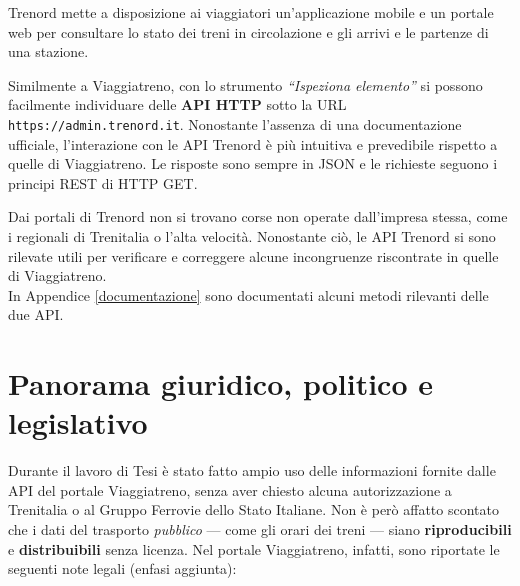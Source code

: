 \documentclass[12pt,italian]{report}
\begin{document}
Trenord mette a disposizione ai viaggiatori un'applicazione mobile e
un portale web per consultare lo stato dei treni in circolazione e gli
arrivi e le partenze di una stazione.

Similmente a Viaggiatreno, con lo strumento \textit{``Ispeziona
    elemento''} si possono facilmente individuare delle \textbf{API
    HTTP} sotto la URL \texttt{https://admin.trenord.it}.  Nonostante
l'assenza di una documentazione ufficiale, l'interazione con le API
Trenord è più intuitiva e prevedibile rispetto a quelle di
Viaggiatreno.  Le risposte sono sempre in JSON e le richieste seguono
i principi REST di HTTP GET.

Dai portali di Trenord non si trovano corse non operate dall'impresa
stessa, come i regionali di Trenitalia o l'alta velocità.  Nonostante
ciò, le API Trenord si sono rilevate utili per verificare e correggere
alcune incongruenze riscontrate in quelle di Viaggiatreno. \\

In Appendice \ref{documentazione} sono documentati alcuni metodi
rilevanti delle due API.

\section{Panorama giuridico, politico e legislativo}

Durante il lavoro di Tesi è stato fatto ampio uso delle informazioni
fornite dalle API del portale Viaggiatreno, senza aver chiesto alcuna
autorizzazione a Trenitalia o al Gruppo Ferrovie dello Stato Italiane.
Non è però affatto scontato che i dati del trasporto \textit{pubblico}
--- come gli orari dei treni --- siano \textbf{riproducibili} e
\textbf{distribuibili} senza licenza.  Nel portale Viaggiatreno,
infatti, sono riportate le seguenti note legali (enfasi aggiunta):
\end{document}
